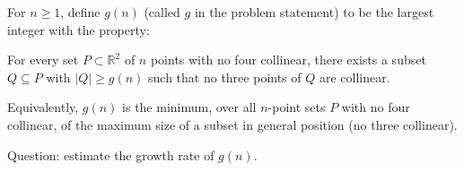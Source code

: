 For $n\ge 1$, define $g(n)$ (called $g$ in the problem statement) to be the largest integer with the property:

For every set $P\subset\mathbb{R}^2$ of $n$ points with no four collinear, there exists a subset $Q\subseteq P$ with $|Q|\ge g(n)$ such that no three points of $Q$ are collinear.

Equivalently, $g(n)$ is the minimum, over all $n$-point sets $P$ with no four collinear, of the maximum size of a subset in general position (no three collinear).

Question: estimate the growth rate of $g(n)$.
